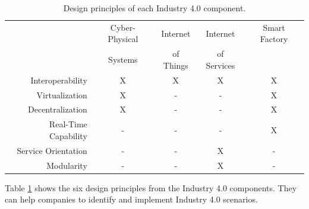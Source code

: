 \begin{table}[htpb]
  \centering
    \begin{tabular}{| r | c c c c |}
      \rowcolor{ob_orange}
      \hline
                            & Cyber-Physical & Internet  & Internet    & Smart Factory \\
      \rowcolor{ob_orange}
                            & Systems        & of Things & of Services &  \\
      \hline
      Interoperability      & X        & X        & X          & X    \\
      Virtualization        & X        & -        & -          & X    \\
      Decentralization      & X        & -        & -          & X    \\
      Real-Time Capability  & -        & -        & -          & X    \\
      Service Orientation   & -        & -        & X          & -    \\
      Modularity            & -        & -        & X          & -    \\
      \hline
    \end{tabular}
  \caption[Design principles of each Industry 4.0 component]{Design principles of each Industry 4.0 component.\autocite[cf.][p. 11]{Her:2015}}
  \label{tab:industryComponents}
\end{table}

Table \ref{tab:industryComponents} shows the six design principles from the Industry 4.0 components.
They can help companies to identify and implement Industry 4.0 scenarios.\autocite[cf.][p. 11]{Her:2015}

